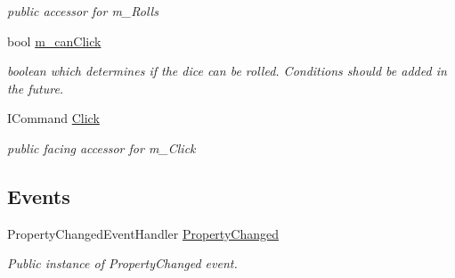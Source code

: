 \begin{DoxyCompactItemize}
\begin{DoxyCompactList}\small\item\em public accessor for m\+\_\+\+Rolls \end{DoxyCompactList}\item 
bool \mbox{\hyperlink{class_dungeons__n___dragons___manager_1_1_viewmodels_1_1_dice_roll_tab_viewmodel_a411453d0806f158d35a8cf07061dcfd2}{m\+\_\+can\+Click}}
\begin{DoxyCompactList}\small\item\em boolean which determines if the dice can be rolled. Conditions should be added in the future. \end{DoxyCompactList}\item 
I\+Command \mbox{\hyperlink{class_dungeons__n___dragons___manager_1_1_viewmodels_1_1_dice_roll_tab_viewmodel_a2aaf5990da387e0eb1d7912cc5c3a718}{Click}}
\begin{DoxyCompactList}\small\item\em public facing accessor for m\+\_\+\+Click \end{DoxyCompactList}\end{DoxyCompactItemize}
\subsection*{Events}
\begin{DoxyCompactItemize}
\item 
Property\+Changed\+Event\+Handler \mbox{\hyperlink{class_dungeons__n___dragons___manager_1_1_viewmodels_1_1_dice_roll_tab_viewmodel_a60a0e298fe415c8468751f7eae890129}{Property\+Changed}}
\begin{DoxyCompactList}\small\item\em Public instance of Property\+Changed event. \end{DoxyCompactList}\end{DoxyCompactItemize}
